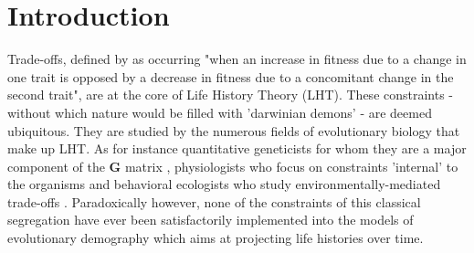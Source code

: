 \documentclass[10pt,a4paper]{article}
\begin{document}

\newpage
\setcounter{tocdepth}{4}
\tableofcontents

\newpage

\section{Introduction}





Trade-offs, defined by \citet{Roff2007} as occurring "when an increase in fitness due to a change in one trait is opposed by a decrease in fitness due to a concomitant change in the second trait", are at the core of Life History Theory (LHT). These constraints - without which nature would be filled with 'darwinian demons' \citep{Law1979} - are deemed ubiquitous.  They are studied by the numerous fields of evolutionary biology that make up LHT. As for instance quantitative geneticists for whom they are a major component of the $\mathbf{G}$ matrix \citep{Lande1982}, physiologists who focus on constraints 'internal' to the organisms  \citep[for instance because of a Y-shaped allocation of finite resources; see][]{Cody1966,Lack1954,Orton1929} and behavioral ecologists who study environmentally-mediated trade-offs \citep[see for instance][]{Jessup2008,Steidinger2014}. Paradoxically however, none of the constraints of this classical segregation have ever been satisfactorily implemented into the models of evolutionary demography which  aims at projecting life histories over time. \\
\end{document}

